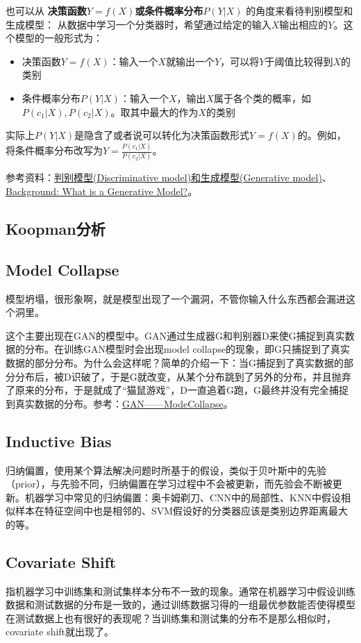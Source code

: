 也可以从 \textbf{决策函数$Y=f(X)$或条件概率分布$P(Y|X)$} 的角度来看待判别模型和生成模型：
从数据中学习一个分类器时，希望通过给定的输入$X$输出相应的$Y$。这个模型的一般形式为：
\begin{itemize}
	\item 决策函数$Y=f(X)$：输入一个$X$就输出一个$Y$，可以将$Y$于阈值比较得到$X$的类别
	\item 条件概率分布$P(Y|X)$：输入一个$X$，输出$X$属于各个类的概率，如$P(c_1 | X), P(c_2 | X)$。取其中最大的作为$X$的类别
\end{itemize}
实际上$P(Y|X)$是隐含了或者说可以转化为决策函数形式$Y=f(X)$的。例如，将条件概率分布改写为$Y = \frac{P(c_1 | X)}{P(c_2 | X) }$。

参考资料：\href{https://blog.csdn.net/fishmemory/article/details/51711114}{判别模型(Discriminative model)和生成模型(Generative model)}、\href{https://developers.google.cn/machine-learning/gan/generative?hl=zh-cn}{Background: What is a Generative Model?}。


\subsection{Koopman分析}


\subsection{Model Collapse}
模型坍塌，很形象啊，就是模型出现了一个漏洞，不管你输入什么东西都会漏进这个洞里。

这个主要出现在GAN的模型中。GAN通过生成器G和判别器D来使G捕捉到真实数据的分布。在训练GAN模型时会出现model collapse的现象，即G只捕捉到了真实数据的部分分布。为什么会这样呢？简单的介绍一下：当G捕捉到了真实数据的部分分布后，被D识破了，于是G就改变，从某个分布跳到了另外的分布，并且抛弃了原来的分布，于是就成了“猫鼠游戏”，D一直追着G跑，G最终并没有完全捕捉到真实数据的分布。参考：\href{https://blog.csdn.net/SPARKKKK/article/details/72598041}{GAN——ModeCollapse}。

\subsection{Inductive Bias}
归纳偏置，使用某个算法解决问题时所基于的假设，类似于贝叶斯中的先验（prior），与先验不同，归纳偏置在学习过程中不会被更新，而先验会不断被更新。机器学习中常见的归纳偏置：奥卡姆剃刀、CNN中的局部性、KNN中假设相似样本在特征空间中也是相邻的、SVM假设好的分类器应该是类别边界距离最大的等。

\subsection{Covariate Shift}
指机器学习中训练集和测试集样本分布不一致的现象。通常在机器学习中假设训练数据和测试数据的分布是一致的，通过训练数据习得的一组最优参数能否使得模型在测试数据上也有很好的表现呢？当训练集和测试集的分布不是那么相似时，covariate shift就出现了。

